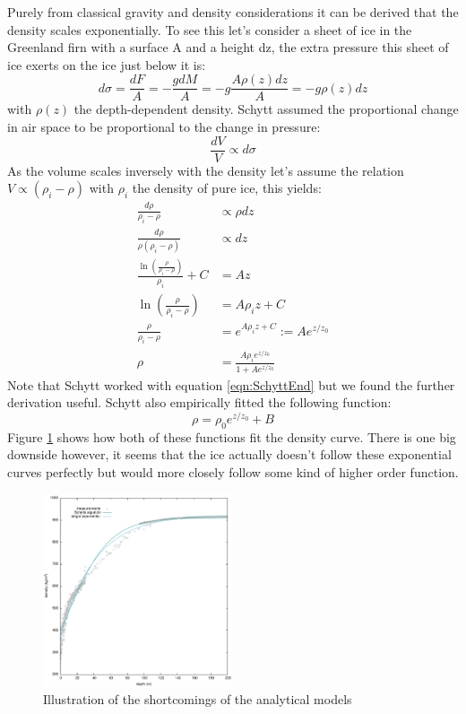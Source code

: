 \documentclass[11pt,a4paper,faculty=we,language=en,doctype=report]{cls/ugent-doc}
\begin{document}
Purely from classical gravity and density considerations it can be derived that
the density scales exponentially. To see this let's consider a sheet of ice in
the Greenland firn with a surface A and a height dz, the extra pressure this
sheet of ice exerts on the ice just below it is:
\begin{equation}
	d\sigma = \frac{dF}{A} = -\frac{gdM}{A} = -g\frac{A\rho(z)dz}{A} = -g\rho(z)dz
\end{equation}
with $\rho(z)$ the depth-dependent density. Schytt assumed the
proportional change in air space to be proportional to the change in
pressure:
\begin{equation}
	\frac{dV}{V} \propto d\sigma
\end{equation}
As the volume scales inversely with the density let's assume the relation $V \propto (\rho_i - \rho)$ with
$\rho_i$ the density of pure ice, this yields\cite{herron_langway_1980}:
\begin{align}
	\frac{d\rho}{\rho_i - \rho} &\propto \rho dz\\
	\frac{d\rho}{\rho(\rho_i - \rho)} &\propto dz \label{eqn:SchyttEnd}\\
	\frac{\ln\left(\frac{\rho}{\rho_i-\rho}\right)}{\rho_i} + C &= Az\\
	\ln\left(\frac{\rho}{\rho_i-\rho}\right) &= A\rho_iz + C\\
	\frac{\rho}{\rho_i-\rho} &= e^{A\rho_iz + C} := Ae^{z/z_0}\\
	\rho &= \frac{A\rho_i e^{z/z_0}}{1 + Ae^{z/z_0}}
\end{align}
Note that Schytt worked with equation \ref{eqn:SchyttEnd} but we found
the further derivation useful. Schytt also empirically fitted the
following function:
\begin{equation}
	\label{eqn:myderiexp}
	\rho = \rho_0 e^{z/z_0} + B
\end{equation}
Figure \ref{fig:DensityMeasurements} shows how both of these
functions fit the density curve.  There is one big downside however,
it seems that the ice actually doesn't follow these exponential
curves perfectly but would more closely follow some kind of higher
order function.
\begin{figure}
  \centering
	\includegraphics[width=0.5\textwidth]{Density_measurements2.pdf}
	\caption{Illustration of the shortcomings of the analytical models}
	\label{fig:DensityMeasurements}
\end{figure}
\end{document}

